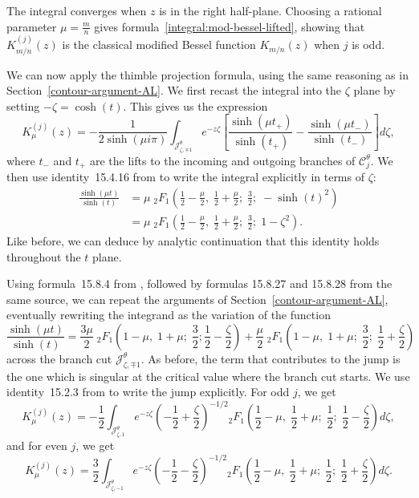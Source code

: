 \documentclass{article}
\theoremstyle{definition}
\theoremstyle{plain}
\begin{document}
The integral converges when $z$ is in the right half-plane. Choosing a rational parameter $\mu = \tfrac{m}{n}$ gives formula~\eqref{integral:mod-bessel-lifted}, showing that $K^{(j)}_{m/n}(z)$ is the classical modified Bessel function $K_{m/n}(z)$ when $j$ is odd.

We can now apply the thimble projection formula, using the same reasoning as in Section~\ref{contour-argument-AL}. We first recast the integral into the $\zeta$ plane by setting $-\zeta = \cosh(t)$. This gives us the expression
\[ K^{(j)}_\mu(z) = -\frac{1}{2\sinh(\mu i\pi)} \int_{\mathcal{J}^\theta_{\zeta, \mp 1}} e^{-z\zeta} \left[ \frac{\sinh(\mu t_+)}{\sinh(t_+)} - \frac{\sinh(\mu t_-)}{\sinh(t_-)} \right] d\zeta, \]
where $t_-$ and $t_+$ are the lifts to the incoming and outgoing branches of $\mathcal{C}^\theta_j$. We then use identity~15.4.16 from \cite{dlmf} to write the integral explicitly in terms of $\zeta$:
\begin{align*}
\frac{\sinh(\mu t)}{\sinh(t)} & = \mu\;{}_2F_1\left(\frac{1}{2} - \frac{\mu}{2},\;\frac{1}{2} + \frac{\mu}{2};\;\frac{3}{2};\;-\sinh(t)^2\right) \\
& = \mu\;{}_2F_1\left(\frac{1}{2} - \frac{\mu}{2},\;\frac{1}{2} + \frac{\mu}{2};\;\frac{3}{2};\;1 - \zeta^2\right).
\end{align*}
Like before, we can deduce by analytic continuation that this identity holds throughout the $t$ plane.

Using formula~15.8.4 from \cite{dlmf}, followed by formulas 15.8.27 and 15.8.28 from the same source, we can repeat the arguments of Section~\ref{contour-argument-AL}, eventually rewriting the integrand as the variation of the function
\[ \frac{\sinh(\mu t)}{\sinh(t)} = \frac{3\mu}{2}\;{}_2F_1\left(1 - \mu,\;1 + \mu;\;\frac{3}{2};\frac{1}{2} - \frac{\zeta}{2}\right) + \frac{\mu}{2}\;{}_2F_1\left(1 - \mu,\;1 + \mu;\;\frac{3}{2};\;\frac{1}{2} + \frac{\zeta}{2}\right) \]
across the branch cut $\mathcal{J}^\theta_{\zeta, \mp 1}$. As before, the term that contributes to the jump is the one which is singular at the critical value where the branch cut starts. We use identity~15.2.3 from \cite{dlmf} to write the jump explicitly. For odd $j$, we get
\begin{equation}\label{eq: K_j_mu at 1}
  K^{(j)}_\mu(z) = -\frac{1}{2} \int_{\mathcal{J}^\theta_{\zeta, 1}} e^{-z\zeta} \left(-\frac{1}{2}+\frac{\zeta}{2}\right)^{-1/2} {}_2F_1\left(\frac{1}{2} - \mu,\;\frac{1}{2} + \mu;\;\frac{1}{2};\;\frac{1}{2} - \frac{\zeta}{2}\right) d\zeta,  
\end{equation}
and for even $j$, we get
\begin{equation}\label{eq: K_j_mu at -1}
 K^{(j)}_\mu(z) = \frac{3}{2} \int_{\mathcal{J}^\theta_{\zeta, -1}} e^{-z\zeta} \left(-\frac{1}{2}-\frac{\zeta}{2}\right)^{-1/2} {}_2F_1\left(\frac{1}{2} - \mu,\;\frac{1}{2} + \mu;\;\frac{1}{2};\;\frac{1}{2} + \frac{\zeta}{2}\right) d\zeta. 
\end{equation}
\end{document}
